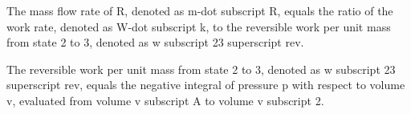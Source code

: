 The mass flow rate of R, denoted as m-dot subscript R, equals the ratio of the work rate, denoted as W-dot subscript k, to the reversible work per unit mass from state 2 to 3, denoted as w subscript 23 superscript rev.

The reversible work per unit mass from state 2 to 3, denoted as w subscript 23 superscript rev, equals the negative integral of pressure p with respect to volume v, evaluated from volume v subscript A to volume v subscript 2.